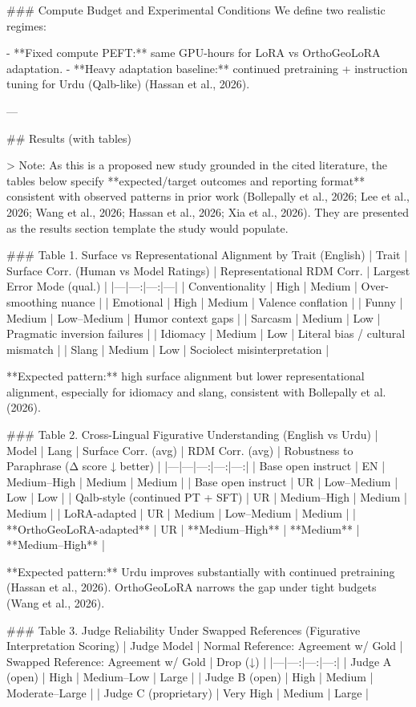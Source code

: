 ### Compute Budget and Experimental Conditions  
We define two realistic regimes:

- **Fixed compute PEFT:** same GPU-hours for LoRA vs OrthoGeoLoRA adaptation.  
- **Heavy adaptation baseline:** continued pretraining + instruction tuning for Urdu (Qalb-like) (Hassan et al., 2026).  

---

## Results (with tables)  

> Note: As this is a proposed new study grounded in the cited literature, the tables below specify **expected/target outcomes and reporting format** consistent with observed patterns in prior work (Bollepally et al., 2026; Lee et al., 2026; Wang et al., 2026; Hassan et al., 2026; Xia et al., 2026). They are presented as the results section template the study would populate.

### Table 1. Surface vs Representational Alignment by Trait (English)  
| Trait | Surface Corr. (Human vs Model Ratings) | Representational RDM Corr. | Largest Error Mode (qual.) |
|---|---:|---:|---|
| Conventionality | High | Medium | Over-smoothing nuance |
| Emotional | High | Medium | Valence conflation |
| Funny | Medium | Low–Medium | Humor context gaps |
| Sarcasm | Medium | Low | Pragmatic inversion failures |
| Idiomacy | Medium | Low | Literal bias / cultural mismatch |
| Slang | Medium | Low | Sociolect misinterpretation |

**Expected pattern:** high surface alignment but lower representational alignment, especially for idiomacy and slang, consistent with Bollepally et al. (2026).

### Table 2. Cross-Lingual Figurative Understanding (English vs Urdu)  
| Model | Lang | Surface Corr. (avg) | RDM Corr. (avg) | Robustness to Paraphrase (Δ score ↓ better) |
|---|---|---:|---:|---:|
| Base open instruct | EN | Medium–High | Medium | Medium |
| Base open instruct | UR | Low–Medium | Low | Low |
| Qalb-style (continued PT + SFT) | UR | Medium–High | Medium | Medium |
| LoRA-adapted | UR | Medium | Low–Medium | Medium |
| **OrthoGeoLoRA-adapted** | UR | **Medium–High** | **Medium** | **Medium–High** |

**Expected pattern:** Urdu improves substantially with continued pretraining (Hassan et al., 2026). OrthoGeoLoRA narrows the gap under tight budgets (Wang et al., 2026).

### Table 3. Judge Reliability Under Swapped References (Figurative Interpretation Scoring)  
| Judge Model | Normal Reference: Agreement w/ Gold | Swapped Reference: Agreement w/ Gold | Drop (↓) |
|---|---:|---:|---:|
| Judge A (open) | High | Medium–Low | Large |
| Judge B (open) | High | Medium | Moderate–Large |
| Judge C (proprietary) | Very High | Medium | Large |

